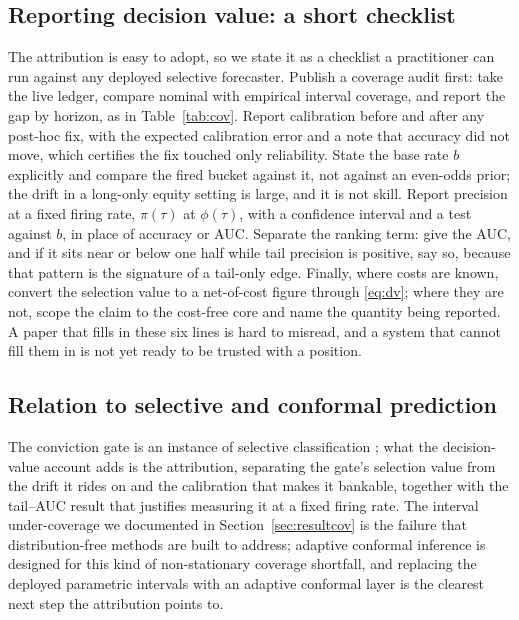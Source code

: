 \documentclass{sbc2023}%
\theoremstyle{definition}
\theoremstyle{plain}
\begin{document}
\subsection{Reporting decision value: a short checklist}
\label{sec:checklist}
The attribution is easy to adopt, so we state it as a checklist a practitioner can run
against any deployed selective forecaster. Publish a coverage audit first: take the live
ledger, compare nominal with empirical interval coverage, and report the gap by horizon,
as in Table~\ref{tab:cov}. Report calibration before and after any post-hoc fix, with
the expected calibration error and a note that accuracy did not move, which certifies
the fix touched only reliability. State the base rate $b$ explicitly and compare the
fired bucket against it, not against an even-odds prior; the drift in a long-only equity
setting is large, and it is not skill. Report precision at a fixed firing rate,
$\pi(\tau)$ at $\phi(\tau)$, with a confidence interval and a test against $b$, in place
of accuracy or AUC. Separate the ranking term: give the AUC, and if it sits near or
below one half while tail precision is positive, say so, because that pattern is the
signature of a tail-only edge. Finally, where costs are known, convert the selection
value to a net-of-cost figure through \eqref{eq:dv}; where they are not, scope the claim
to the cost-free core and name the quantity being reported. A paper that fills in these
six lines is hard to misread, and a system that cannot fill them in is not yet ready to
be trusted with a position.

\subsection{Relation to selective and conformal prediction}
The conviction gate is an instance of selective classification \citep{chow1970,geifman2017}; what the decision-value account adds is the attribution,
separating the gate's selection value from the drift it rides on and the calibration
that makes it bankable, together with the tail--AUC result that justifies measuring it at a
fixed firing rate. The interval under-coverage we documented in
Section~\ref{sec:resultcov} is the failure that distribution-free methods are
built to address; adaptive conformal inference \citep{gibbs2021,angelopoulos2021} is designed for this kind of non-stationary
coverage shortfall, and replacing the deployed parametric intervals with an adaptive
conformal layer is the clearest next step the attribution points to.
\end{document}
